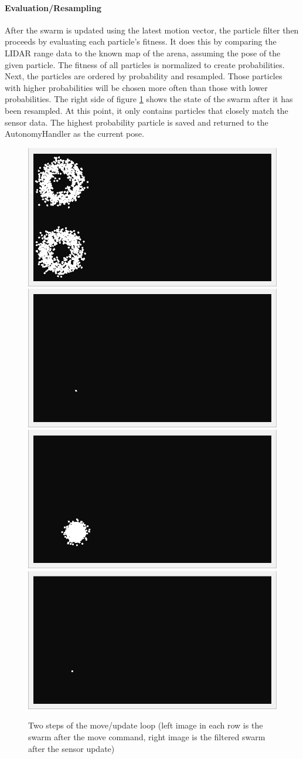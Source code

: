 \paragraph{Evaluation/Resampling}
After the swarm is updated using the latest motion vector, the particle filter then proceeds by evaluating each particle's fitness.  It does this by comparing the LIDAR range data to the known map of the arena, assuming the pose of the given particle.  The fitness of all particles is normalized to create probabilities.  Next, the particles are ordered by probability and resampled.  Those particles with higher probabilities will be chosen more often than those with lower probabilities.  The right side of figure \ref{fig:swarm-loop} shows the state of the swarm after it has been resampled.  At this point, it only contains particles that closely match the sensor data.  The highest probability particle is saved and returned to the AutonomyHandler as the current pose.
\begin{figure}[H]
\includegraphics[width=0.5\linewidth]{swarm-first-move.png}\includegraphics[width=0.5\linewidth]{swarm-first-update.png}
\includegraphics[width=0.5\linewidth]{swarm-second-move.png}\includegraphics[width=0.5\linewidth]{swarm-second-update.png}
\caption{Two steps of the move/update loop (left image in each row is the swarm after the move command, right image is the filtered swarm after the sensor update)}
\label{fig:swarm-loop}
\end{figure}
